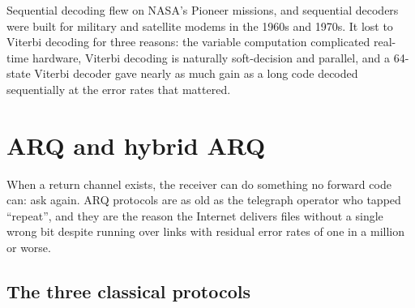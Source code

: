 Sequential decoding flew on NASA's Pioneer missions, and sequential decoders were built for military and
satellite modems in the 1960s and 1970s. It lost to Viterbi decoding for three reasons: the variable
computation complicated real-time hardware, Viterbi decoding is naturally soft-decision and parallel,
and a 64-state Viterbi decoder gave nearly as much gain as a long code decoded sequentially at the
error rates that mattered.

\section{ARQ and hybrid ARQ}
\label{sec:ch14:arq}

When a return channel exists, the receiver can do something no forward code can: ask again. ARQ
protocols are as old as the telegraph operator who tapped ``repeat'', and they are the reason the
Internet delivers files without a single wrong bit despite running over links with residual error rates
of one in a million or worse.


\subsection{The three classical protocols}

